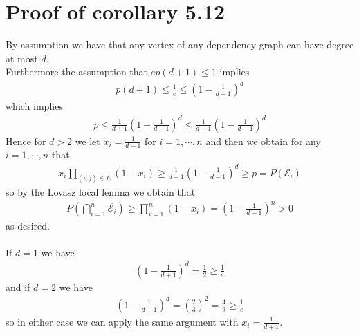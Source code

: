 \section*{Proof of corollary 5.12}
By assumption we have that any vertex of any dependency graph can have degree at most $d$. \\ 
Furthermore the assumption that $ep(d+1) \leq 1$ implies
\begin{align*}
	p(d+1) \leq \frac{1}{e} \leq \left( 1-\frac{1}{d-1} \right)^d
\end{align*}
which implies
\begin{align*}
	p \leq \frac{1}{d+1}\left( 1-\frac{1}{d-1} \right)^d \leq \frac{1}{d-1}\left( 1-\frac{1}{d-1} \right)^d
\end{align*}
Hence for $d>2$ we let $x_i=\frac{1}{d-1}$ for $i=1,\cdots,n$ and then we obtain for any $i=1,\cdots,n$ that
\begin{align*}
	x_i \prod_{(i,j) \in E}\left( 1-x_i \right) \geq \frac{1}{d-1}\left( 1-\frac{1}{d-1} \right)^d \geq p =P(\mathcal{E}_i)
\end{align*}
so by the Lovasz local lemma we obtain that
\begin{align*}
	P\left( \bigcap_{i=1}^n \overline{\mathcal{E}_i} \right) \geq \prod_{i=1}^n\left( 1-x_i \right)=\left( 1-\frac{1}{d-1} \right)^n>0
\end{align*}
as desired. \\ \\
If $d=1$ we have
\begin{align*}
	\left( 1-\frac{1}{d+1} \right)^d=\frac{1}{2} \geq \frac{1}{e}
\end{align*}
and if $d=2$ we have
\begin{align*}
	\left( 1-\frac{1}{d+1} \right)^d=\left(\frac{2}{3} \right)^2=\frac{4}{9} \geq \frac{1}{e}
\end{align*}
so in either case we can apply the same argument with $x_i=\frac{1}{d+1}$.
